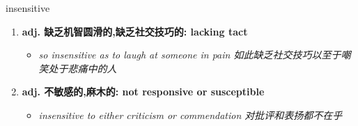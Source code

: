 
\begin{frame}
{\huge insensitive}
\begin{center}
\begin{enumerate}\Large
  \item \textbf{adj. 缺乏机智圆滑的,缺乏社交技巧的: lacking tact}
  \begin{itemize}
    \item \em{\Large{so insensitive as to laugh at someone in pain 如此缺乏社交技巧以至于嘲笑处于悲痛中的人}}
  \end{itemize}
  \item \textbf{adj. 不敏感的,麻木的: not responsive or susceptible}
  \begin{itemize}
    \item \em{\Large{insensitive to either criticism or commendation 对批评和表扬都不在乎}}
  \end{itemize}
\end{enumerate}
\end{center}
\end{frame}
